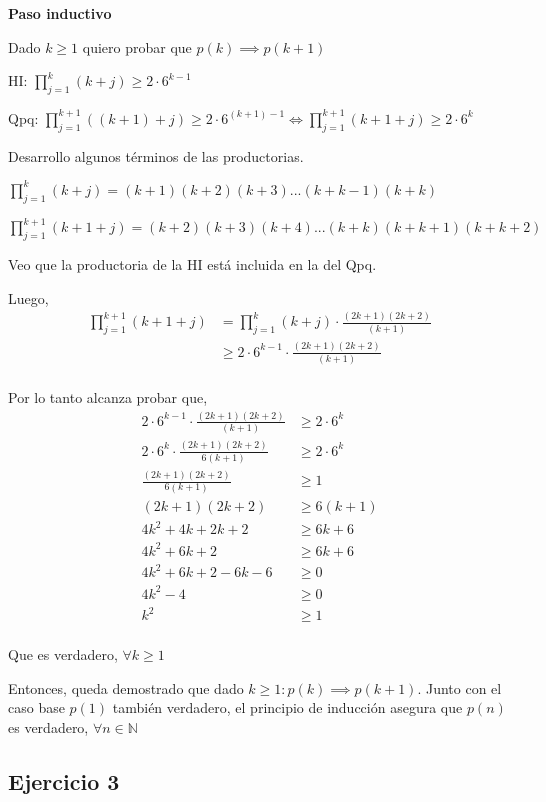 \textbf{Paso inductivo}

Dado $ k \geq 1 $ quiero probar que $ p(k) \implies p(k+1) $

HI: $ \prod_{j=1}^{k}(k+j) \geq 2 \cdot 6^{k-1} $ 

Qpq: $ \prod_{j=1}^{k+1}((k+1)+j) \geq 2 \cdot 6^{(k+1)-1} \iff \prod_{j=1}^{k+1}(k+1+j) \geq 2 \cdot 6^{k} $

Desarrollo algunos términos de las productorias.

$ \prod_{j=1}^{k}(k+j) = (k+1)(k+2)(k+3)...(k+k-1)(k+k)$

$ \prod_{j=1}^{k+1}(k+1+j) = (k+2)(k+3)(k+4)...(k+k)(k+k+1)(k+k+2)$

Veo que la productoria de la HI está incluida en la del Qpq.

Luego,
\begin{align*}
    \prod_{j=1}^{k+1}(k+1+j) &= \prod_{j=1}^{k}(k+j) \cdot \frac{(2k+1)(2k+2)}{(k+1)} \\
    &\geq 2 \cdot 6^{k-1} \cdot \frac{(2k+1)(2k+2)}{(k+1)} \\
\end{align*}

Por lo tanto alcanza probar que,
\begin{align*}
    2 \cdot 6^{k-1} \cdot \frac{(2k+1)(2k+2)}{(k+1)} &\geq 2 \cdot 6^k \\
    2 \cdot 6^k \cdot \frac{(2k+1)(2k+2)}{6(k+1)} &\geq 2 \cdot 6^k \\
    \frac{(2k+1)(2k+2)}{6(k+1)} &\geq 1 \\
    (2k+1)(2k+2) &\geq 6(k+1) \\
    4k^2+4k+2k+2 &\geq 6k+6 \\
    4k^2+6k+2 &\geq 6k+6 \\
    4k^2+6k+2 - 6k - 6 &\geq 0 \\
    4k^2 - 4 &\geq 0 \\
    k^2 &\geq 1 \\
\end{align*}

Que es verdadero, $ \forall k \geq 1 $

Entonces, queda demostrado que dado $ k \geq 1: p(k) \implies p(k+1) $. Junto con el caso base $ p(1) $ también verdadero, el principio de inducción asegura que $ p(n) $ es verdadero, $ \forall n \in \mathbb{N} $

\subsection{Ejercicio 3}

